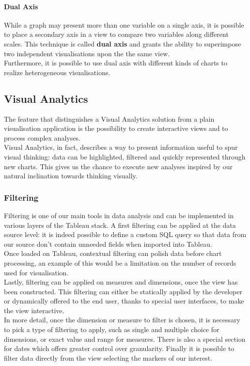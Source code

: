 \paragraph{Dual Axis}
While a graph may present more than one variable on a single axis, it is possible to place a secondary axis in a view to compare two variables along different scales. This technique is called \textbf{dual axis} and grants the ability to superimpose two independent visualisations upon the the same view.\\
Furthermore, it is possible to use dual axis with different kinds of charts to realize heterogeneous visualisations.

\subsection{Visual Analytics}

The feature that distinguishes a Visual Analytics solution from a plain visualisation application is the possibility to create interactive views and to process complex analyses.\\
Visual Analytics, in fact, describes a way to present information useful to spur visual thinking: data can be highlighted, filtered and quickly represented through new charts. This gives us the chance to execute new analyses inspired by our natural inclination towards thinking visually.

\subsubsection{Filtering}

Filtering is one of our main tools in data analysis and can be implemented in various layers of the Tableau stack.
A first filtering can be applied at the data source level: it is indeed possible to define a custom SQL query so that data from our source don't contain unneeded fields when imported into Tableau.\\
Once loaded on Tableau, contextual filtering can polish data before chart processing, an example of this would be a limitation on the number of records used for visualisation.\\
Lastly, filtering can be applied on measures and dimensions, once the view has been constructed. This filtering can either be statically applied by the developer or dynamically offered to the end user, thanks to special user interfaces, to make the view interactive.
\\
In more detail, once the dimension or measure to filter is chosen, it is necessary to pick a type of filtering to apply, such as single and multiple choice for dimensions, or exact value and range for measures. There is also a special section for dates which offers greater control over granularity.
Finally it is possible to filter data directly from the view selecting the markers of our interest.

